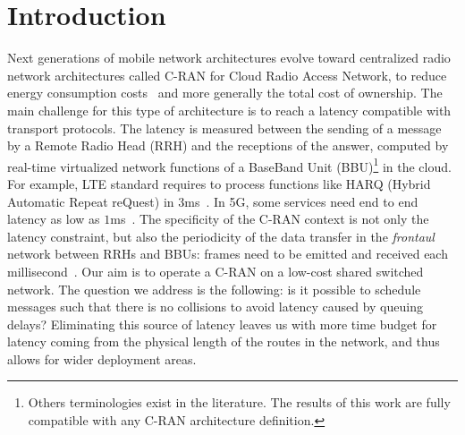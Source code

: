 \documentclass[10pt, conference, letterpaper]{IEEEtran}
\begin{document}
\section{Introduction}

Next generations of mobile network architectures evolve toward centralized radio network architectures called C-RAN for Cloud Radio Access Network, to reduce energy consumption costs~\cite{mobile2011c} and more generally the total cost of ownership. The main challenge for this type of architecture is to reach a latency compatible with transport protocols. The latency is measured between the sending of a message by a Remote Radio Head (RRH) and the receptions of the answer, computed by real-time virtualized network functions of a BaseBand Unit (BBU)\footnote{Others terminologies exist in the literature. The results of this work are fully compatible with any C-RAN architecture definition.} in the cloud. For example, LTE standard requires to process functions like HARQ (Hybrid Automatic Repeat reQuest) in $3$ms~\cite{bouguen2012lte}. In 5G, some services need end to end latency as low as $1$ms~\cite{3gpp5g}. The specificity of the C-RAN context is not only the latency constraint, but also the periodicity of the data transfer in the \emph{frontaul} network between RRHs and BBUs: frames need to be emitted and received each millisecond~\cite{bouguen2012lte}.
Our aim is to operate a C-RAN on a low-cost shared switched network.
The question we address is the following: is it possible to schedule messages such that there is no collisions to avoid latency caused by queuing delays? 
Eliminating this source of latency leaves us with more time budget for latency coming from the physical length of the routes in the network, and thus allows for wider deployment areas.
\end{document}
